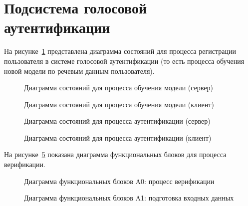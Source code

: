 \section{Подсистема голосовой аутентификации}

На рисунке~\ref{fig:enrollment_server_sd} представлена диаграмма состояний для процесса регистрации пользователя в системе голосовой аутентификации (то есть процесса обучения новой модели по речевым данным пользователя).

\begin{figure}
    \caption{Диаграмма состояний для процесса обучения модели (сервер)}
    \label{fig:enrollment_server_sd}
\end{figure}

\begin{figure}
    \caption{Диаграмма состояний для процесса обучения модели (клиент)}
    \label{fig:enrollment_client_sd}
\end{figure}

\begin{figure}
    \caption{Диаграмма состояний для процесса аутентификации (сервер)}
    \label{fig:verification_server_sd}
\end{figure}

\begin{figure}
    \caption{Диаграмма состояний для процесса аутентификации (клиент)}
    \label{fig:verification_client_sd}
\end{figure}

На рисунке~\ref{fig:idef0_main} показана диаграмма функциональных блоков для процесса верификации.

\begin{figure}
    \caption{Диаграмма функциональных блоков A0: процесс верификации}
    \label{fig:idef0_main}
\end{figure}

\begin{figure}
    \caption{Диаграмма функциональных блоков A1: подготовка входных данных}
    \label{fig:idef0_pre}
\end{figure}

